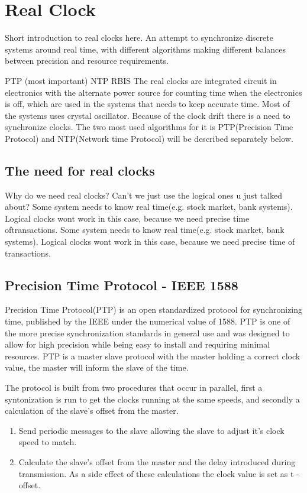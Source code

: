 \section{Real Clock}\label{sc:realClock}

Short introduction to real clocks here.
An attempt to synchronize discrete systems around real time, with different algorithms making different balances between precision and resource requirements.

PTP (most important)
NTP
RBIS
The real clocks are integrated circuit in electronics with the alternate power source for counting time when the electronics is off, which are used in the systems that needs to keep accurate time. Most of the systems uses crystal oscillator. Because of the clock drift there is a need to synchronize clocks. The two most used algorithms for it is PTP(Precision Time Protocol) and NTP(Network time Protocol) will be described separately below.

\subsection{The need for real clocks}

Why do we need real clocks? Can't we just use the logical ones u just talked about?
Some system needs to know real time(e.g. stock market, bank systems). Logical clocks wont work in this case, because we need precise time oftransactions.
Some system needs to know real time(e.g. stock market, bank systems). Logical clocks wont work in this
case, because we need precise time of transactions.


\subsection{Precision Time Protocol - IEEE 1588}

Precision Time Protocol(PTP) is an open standardized protocol for synchronizing time, published by the IEEE under the numerical value of 1588. PTP is one of the more precise synchronization standards in general use and was designed to allow for high precision while being easy to install and requiring minimal resources. PTP is a master slave protocol with the master holding a correct clock value, the master will inform the slave of the time.

The protocol is built from two procedures that occur in parallel, first a syntonization is run to get the clocks running at the same speeds, and secondly a calculation of the slave's offset from the master. 
\begin{enumerate}
\item Send periodic messages to the slave allowing the slave to adjust it's clock speed to match.
\item Calculate the slave's offset from the master and the delay introduced during transmission. As a side effect of these calculations the clock value is set as t - offset.
\end{enumerate}

